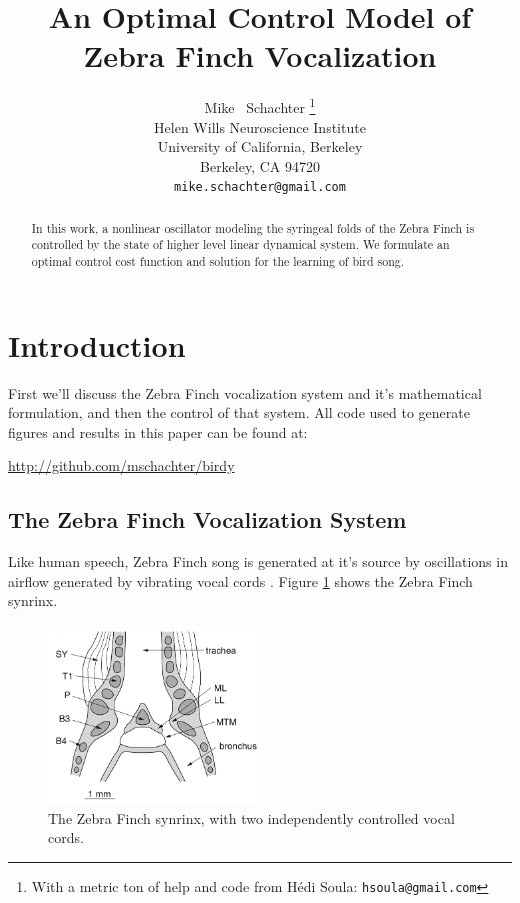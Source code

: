 \documentclass{article} %
\title{An Optimal Control Model of Zebra Finch Vocalization}
\author{
Mike ~Schachter
\thanks{ With a metric ton of help and code from H\'{e}di Soula:
\texttt{hsoula@gmail.com}} \\
Helen Wills Neuroscience Institute\\
University of California, Berkeley\\
Berkeley, CA 94720 \\
\texttt{mike.schachter@gmail.com}
}
\begin{document}
\maketitle

\begin{abstract}
In this work, a nonlinear oscillator modeling the syringeal folds of the
Zebra Finch is controlled by the state of higher level linear dynamical system.
We formulate an optimal control cost function and solution for the learning of
bird song.
\end{abstract}

\section{Introduction}

First we'll discuss the Zebra Finch vocalization system and it's mathematical
formulation, and then the control of that system. All code used to generate
figures and results in this paper can be found at:
\begin{center}
   \url{http://github.com/mschachter/birdy}
\end{center}

\subsection{The Zebra Finch Vocalization System}

Like human speech, Zebra Finch song is generated at it's source by oscillations in airflow
generated by vibrating vocal cords \cite{Mindlin2005}. Figure \ref{fig:vocal_tract} shows the Zebra Finch
synrinx.

\begin{figure}[h]
\centering
\includegraphics[width=0.5\textwidth]{images/tracheobronchial_syrinx.png}
\caption{The Zebra Finch synrinx, with two independently controlled vocal cords.}
\label{fig:vocal_tract}
\end{figure}
\end{document}

